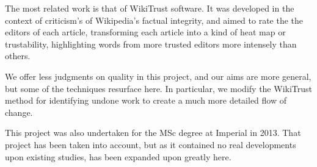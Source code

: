 The most related work is that of WikiTrust software. It was developed
in the context of criticism's of Wikipedia's factual integrity, and
aimed to rate the the editors of each article, transforming each
article into a kind of heat map or trustability, highlighting words
from more trusted editors more intensely than others. 

We offer less judgments on quality in this project, and our aims are
more general, but some of the techniques resurface here. In
particular, we modify the WikiTrust method for identifying undone work
to create a much more detailed flow of change.

This project was also undertaken for the MSc degree at Imperial in
2013. That project has been taken into account, but as it contained no
real developments upon existing studies, has been expanded upon
greatly here.
